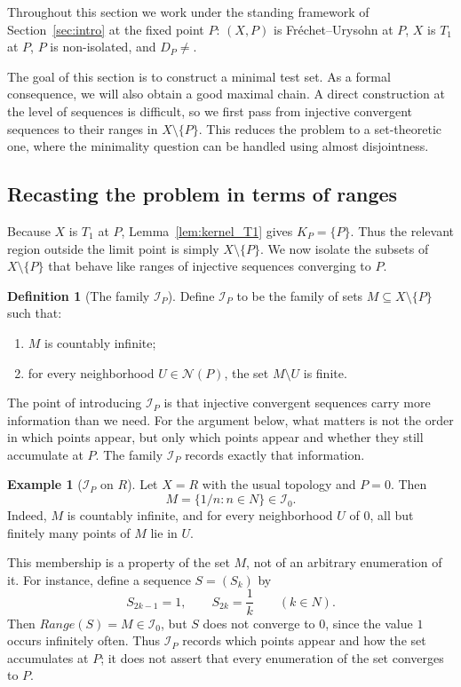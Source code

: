 \documentclass[11pt]{amsart}
\theoremstyle{plain}
\theoremstyle{definition}
\newtheorem{definition}[theorem]{Definition}
\newtheorem{example}[theorem]{Example}
\theoremstyle{remark}
\newcommand{\Dp}{\mathcal{D}_P}
\newcommand{\N}{\mathbb{N}}
\newcommand{\R}{\mathbb{R}}
\DeclareMathOperator{\Range}{Range}
\def\Dp{D_P}%
\def\N{N}%
\def\R{R}%
\def\Range{Range}%
\def\emptyset{}%
\begin{document}
Throughout this section we work under the standing framework of Section~\ref{sec:intro} at the fixed point $P$:
$(X,P)$ is Fr\'echet--Urysohn at $P$, $X$ is $T_1$ at $P$, $P$ is non-isolated, and $\Dp\neq\emptyset$.

The goal of this section is to construct a minimal test set.
As a formal consequence, we will also obtain a good maximal chain.
A direct construction at the level of sequences is difficult, so we first pass from injective convergent sequences to their ranges in $X\setminus\{P\}$.
This reduces the problem to a set-theoretic one, where the minimality question can be handled using almost disjointness.

\subsection{Recasting the problem in terms of ranges}

Because $X$ is $T_1$ at $P$, Lemma~\ref{lem:kernel_T1} gives $K_P=\{P\}$.
Thus the relevant region outside the limit point is simply $X\setminus\{P\}$.
We now isolate the subsets of $X\setminus\{P\}$ that behave like ranges of injective sequences converging to $P$.

\begin{definition}[The family $\mathcal I_P$]\label{def:IP_T1}
Define $\mathcal I_P$ to be the family of sets $M\subseteq X\setminus\{P\}$ such that:
\begin{enumerate}[label=(\roman*)]
\item $M$ is countably infinite;
\item for every neighborhood $U\in\mathcal N(P)$, the set $M\setminus U$ is finite.
\end{enumerate}
\end{definition}

The point of introducing $\mathcal I_P$ is that injective convergent sequences carry more information than we need.
For the argument below, what matters is not the order in which points appear, but only which points appear and whether they still accumulate at $P$.
The family $\mathcal I_P$ records exactly that information.

\begin{example}[$\mathcal I_P$ on $\R$]\label{ex:IP_real_T1}
Let $X=\R$ with the usual topology and $P=0$.
Then
\[
M=\{1/n:n\in\N\}\in\mathcal I_0.
\]
Indeed, $M$ is countably infinite, and for every neighborhood $U$ of $0$, all but finitely many points of $M$ lie in $U$.

This membership is a property of the set $M$, not of an arbitrary enumeration of it.
For instance, define a sequence $S=(S_k)$ by
\[
S_{2k-1}=1,
\qquad
S_{2k}=\frac{1}{k}
\qquad (k\in\N).
\]
Then $\Range(S)=M\in\mathcal I_0$, but $S$ does not converge to $0$, since the value $1$ occurs infinitely often.
Thus $\mathcal I_P$ records which points appear and how the set accumulates at $P$; it does not assert that every enumeration of the set converges to $P$.
\end{example}
\end{document}
